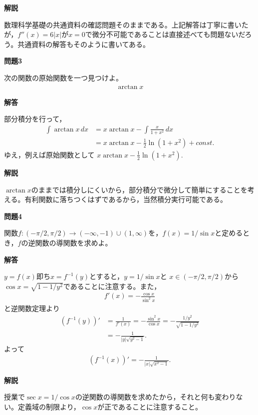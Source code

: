 \documentclass[a4paper,12pt,dvipdfmx,fleqn, oneside]{jsarticle}
\theoremstyle{defstyle}
\theoremstyle{thmx}
\theoremstyle{qesstyle}
\begin{document}
\textbf{解説}

数理科学基礎の共通資料の確認問題そのままである。上記解答は丁寧に書いたが，$f''(x)=6|x|$が$x=0$で微分不可能であることは直接述べても問題ないだろう。共通資料の解答もそのように書いてある。

\begin{shadebox}
    \textbf{問題3}

    次の関数の原始関数を一つ見つけよ。
    \begin{align*}
        \arctan x
    \end{align*}
\end{shadebox}

\begin{screen}
    \textbf{解答}

    \text{　}部分積分を行って，
    \begin{align*}
        \int \arctan x \, dx & = x \arctan x - \int \frac{x}{1+x^2} \, dx        \\
                             & = x \arctan x - \frac{1}{2} \ln (1+ x^2) + const.
    \end{align*}
    ゆえ，例えば原始関数として $x \arctan x - \frac{1}{2} \ln (1+ x^2).  $
\end{screen}

\textbf{解説}

$\arctan x$のままでは積分しにくいから，部分積分で微分して簡単にすることを考える。有利関数に落ちつくはずであるから，当然積分実行可能である。

\begin{shadebox}
    \textbf{問題4}

    関数$f:(-\pi/ 2, \pi / 2) \rightarrow (- \infty , -1) \cup (1, \infty)$を，$f(x)=1/\sin x$と定めるとき，$f$の逆関数の導関数を求めよ。
\end{shadebox}

\begin{screen}
    \textbf{解答}

    \text{　}$y=f(x)$即ち$x=f^{-1}(y)$とすると，$y=1/\sin x $と $x \in (-\pi /2 , \pi /2)$から$\cos x = \sqrt{1-1/y^2}$であることに注意する。また，
    \begin{align*}
        f'(x)=- \frac{\cos x}{\sin^2 x}
    \end{align*}
    と逆関数定理より
    \begin{align*}
        (f^{-1}(y))' & = \frac{1}{f'(x)}
        = - \frac{\sin ^2 x}{\cos x}              = - \frac{1/y^2}{\sqrt{1-1/y^2}} \\
                     & = - \frac{1}{|y|\sqrt{y^2-1}}.
    \end{align*}
    よって
    \begin{align*}
        (f^{-1}(x))' = - \frac{1}{|x|\sqrt{x^2-1}}.
    \end{align*}
\end{screen}
\newpage
\textbf{解説}

授業で$\sec x = 1/ \cos x$の逆関数の導関数を求めたから，それと何も変わりない。定義域の制限より，$\cos x$が正であることに注意すること。
\end{document}
